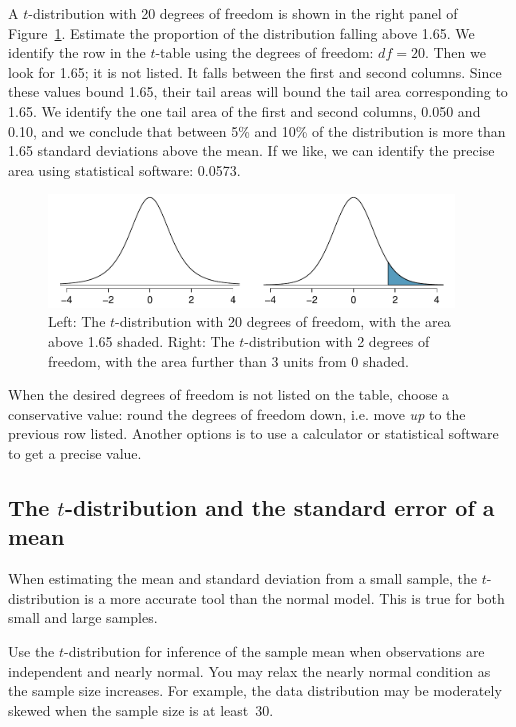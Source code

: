 \begin{example}{A $t$-distribution with 20 degrees of freedom is shown in the right panel of Figure~\ref{tDistDF3_and_20}. Estimate the proportion of the distribution falling above 1.65.}
We identify the row in the $t$-table using the degrees of freedom: $df=20$. Then we look for 1.65; it is not listed. It falls between the first and second columns. Since these values bound 1.65, their tail areas will bound the tail area corresponding to 1.65. We identify the one tail area of the first and second columns, 0.050 and 0.10, and we conclude that between 5\% and 10\% of the distribution is more than 1.65 standard deviations above the mean. If we like, we can identify the precise area using statistical software: 0.0573.
\end{example}

\begin{figure}
\centering
\includegraphics[width=0.96\textwidth]{ch_inference_for_means/figures/tDistDF3_and_20/tDistDF3_and_20}
\caption{Left: The $t$-distribution with 20 degrees of freedom, with the area above 1.65 shaded. Right: The $t$-distribution with 2 degrees of freedom, with the area further than 3 units from 0 shaded.}
\label{tDistDF3_and_20}
\end{figure}

When the desired degrees of freedom is not listed on the table, choose a conservative value: round the degrees of freedom down, i.e. move \emph{up} to the previous row listed. Another options is to use a calculator or statistical software to get a precise value.

\subsection{The $t$-distribution and the standard error of a mean}
\label{tDistSolutionToSEProblem}

When estimating the mean and standard deviation from a small sample, the $t$-distribution is a more accurate tool than the normal model. This is true for both small and large samples.

\begin{tipBox}{
Use the $t$-distribution for inference of the sample mean when observations are independent and nearly normal. You may relax the nearly normal condition as the sample size increases. For example, the data distribution may be moderately skewed when the sample size is at least~30.
}
\end{tipBox}

